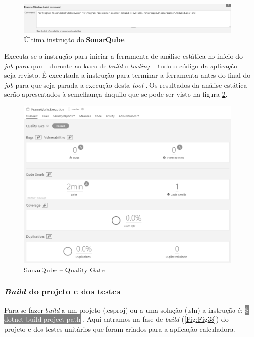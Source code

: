 \begin{figure}[hbt!]
\centering
\includegraphics[width=0.9\linewidth]{Cap5/JenkinsSonarQubeFinish.png}
\caption{Última instrução do \textbf{SonarQube}}
\label{Fig:Fig36}
\end{figure}

\hspace{1cm}Executa-se a instrução para iniciar a ferramenta de análise estática no início do \textit{job} para que -- durante as fases de \textit{build} e \textit{testing} -- todo o código da aplicação seja revisto. É executada a instrução para terminar a ferramenta antes do final do \textit{job} para que seja parada a execução desta \textit{tool} \cite{sonarqubejenkins}. Os resultados da análise estática serão apresentados à semelhança daquilo que se pode ser visto na figura \ref{Fig:Fig37}.

\begin{figure}[hbt!]
\centering
\includegraphics[width=0.8\linewidth]{Cap5/SonarQube.png}
\caption{SonarQube -- Quality Gate}
\label{Fig:Fig37}
\end{figure}

\subsubsection{\textit{Build} do projeto e dos testes}

\hspace{1cm}Para se fazer \textit{build} a um projeto (.csproj) ou a uma solução (.sln) a instrução é: \colorbox{gray}{\textcolor{white}{\$ dotnet build project-path}} \cite{dotnetbuild}. Aqui entramos na fase de \textit{build} (\ref{Fig:Fig38}) do projeto e dos testes unitários que foram criados para a aplicação calculadora.

